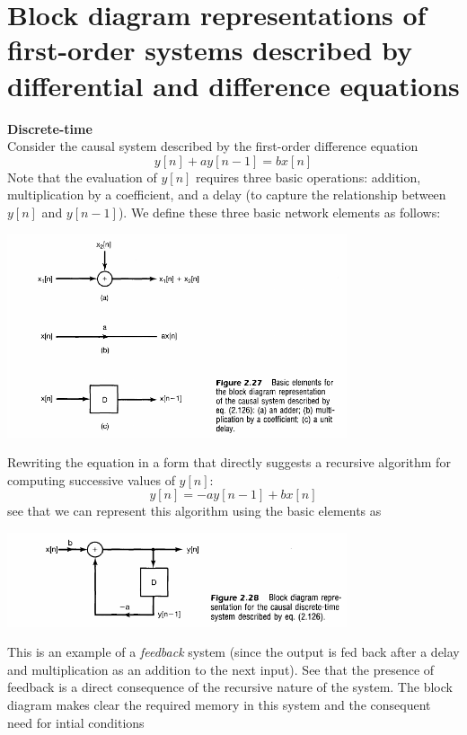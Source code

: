 \documentclass{report}
\begin{document}
\section{Block diagram representations of first-order systems described by differential and difference equations}
\textbf{Discrete-time}\\
Consider the causal system described by the first-order difference equation
\begin{equation*}
y[n]+ay[n-1]=bx[n]
\end{equation*}
Note that the evaluation of $y[n]$ requires three basic operations: addition, multiplication by a coefficient, and a delay (to capture
the relationship between $y[n]$ and $y[n-1]$). We define these three basic network elements as follows:
\begin{center}
\includegraphics[width=10cm]{a48}
\end{center}
Rewriting the equation in a form that directly suggests a recursive algorithm for computing successive values of $y[n]$:
\begin{equation*}
y[n]=-ay[n-1]+bx[n]
\end{equation*}
see that we can represent this algorithm using the basic elements as
\begin{center}
\includegraphics[width=10cm]{a49}
\end{center}
This is an example of a \textit{feedback} system (since the output is fed back after a delay and multiplication as an addition to the
next input). See that the presence of feedback is a direct consequence of the recursive nature of the system. 
The block diagram makes clear the required memory in this system and the consequent need for intial conditions 
\end{document}
